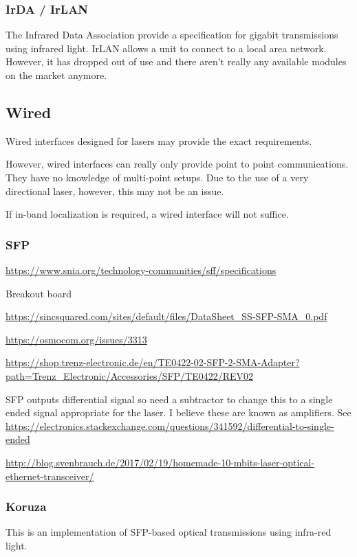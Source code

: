 \documentclass{article}
\begin{document}
\subsubsection{IrDA / IrLAN}
The Infrared Data Association provide a specification for gigabit transmissions using infrared light. IrLAN allows a unit to connect to a local area network. However, it has dropped out of use and there aren't really any available modules on the market anymore.

\subsection{Wired}
Wired interfaces designed for lasers may provide the exact requirements.

However, wired interfaces can really only provide point to point communications. They have no knowledge of multi-point setups. Due to the use of a very directional laser, however, this may not be an issue.

If in-band localization is required, a wired interface will not suffice.

\subsubsection{\ac{SFP}}

\url{https://www.snia.org/technology-communities/sff/specifications}

Breakout board

\url{https://sincsquared.com/sites/default/files/DataSheet_SS-SFP-SMA_0.pdf}

\url{https://osmocom.org/issues/3313}

\url{https://shop.trenz-electronic.de/en/TE0422-02-SFP-2-SMA-Adapter?path=Trenz_Electronic/Accessories/SFP/TE0422/REV02}

\ac{SFP} outputs differential signal so need a subtractor to change this to a single ended signal appropriate for the laser. I believe these are known as amplifiers. See \url{https://electronics.stackexchange.com/questions/341592/differential-to-single-ended}

\url{http://blog.svenbrauch.de/2017/02/19/homemade-10-mbits-laser-optical-ethernet-transceiver/}

\subsubsection{Koruza}
This is an implementation of \ac{SFP}-based optical transmissions using infra-red light.
\end{document}
